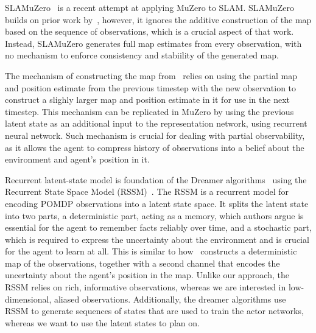 \documentclass[12pt]{article}
\begin{document}
SLAMuZero~\cite{fangSLAMuZeroPlanLearn2024} is a recent attempt at applying MuZero to SLAM. 
SLAMuZero builds on prior work by~\textcite{chaplotLearningExploreUsing2020}, however, it ignores the additive construction of the map based on the sequence of observations, which is a crucial aspect of that work. 
Instead, SLAMuZero generates full map estimates from every observation, with no mechanism to enforce consistency and stabiility of the generated map. 

The mechanism of constructing the map from~\textcite{chaplotLearningExploreUsing2020} relies on using the partial map and position estimate from the previous timestep with the new observation to construct a slighly larger map and position estimate in it for use in the next timestep. 
This mechanism can be replicated in MuZero by using the previous latent state as an additional input to the representation network, using recurrent neural network.
Such mechanism is crucial for dealing with partial observability, as it allows the agent to compress history of observations into a belief about the environment and agent's position in it. 

Recurrent latent-state model is foundation of the Dreamer algorithms~\cite{hafnerMasteringDiverseDomains2024} using the Recurrent State Space Model (RSSM)~\cite{hafnerLearningLatentDynamics2019}. The RSSM is a recurrent model for encoding POMDP observations into a latent state space. It splits the latent state into two parts, a deterministic part, acting as a memory, which authors argue is essential for the agent to remember facts reliably over time, and a stochastic part, which is required to express the uncertainty about the environment and is crucial for the agent to learn at all. This is similar to how~\textcite{chaplotLearningExploreUsing2020} constructs a deterministic map of the observations, together with a second channel that encodes the uncertainty about the agent's position in the map.
Unlike our approach, the RSSM relies on rich, informative observations, whereas we are interested in low-dimensional, aliased observations. Additionally, the dreamer algorithms use RSSM to generate sequences of states that are used to train the actor networks, whereas we want to use the latent states to plan on.

\end{document}
